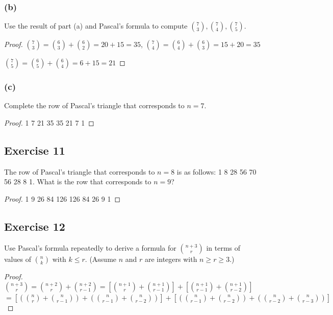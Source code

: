 \documentclass[14pt]{extarticle}
\begin{document}
\subsubsection{(b)}
Use the result of part (a) and Pascal’s formula to compute 
\(\binom{7}{3}, \binom{7}{4}, \binom{7}{5}\).

\begin{proof}
\(\binom{7}{3} = \binom{6}{3} + \binom{6}{2} = 20 + 15 = 35\),
\(\binom{7}{4} = \binom{6}{4} + \binom{6}{3} = 15 + 20 = 35\)

\(\binom{7}{5} = \binom{6}{5} + \binom{6}{4} = 6 + 15 = 21\)
\end{proof}

\subsubsection{(c)}
Complete the row of Pascal’s triangle that corresponds to \(n = 7\).

\begin{proof}
1 7 21 35 35 21 7 1
\end{proof}

\subsection{Exercise 11}
The row of Pascal’s triangle that corresponds to \(n = 8\) is as follows: 1 8 28 56 70 56 28 8 1. What is the row that 
corresponds to \(n = 9\)?

\begin{proof}
1 9 26 84 126 126 84 26 9 1
\end{proof}

\subsection{Exercise 12}
Use Pascal’s formula repeatedly to derive a formula for \(\binom{n+3}{r}\) in terms of values of \(\binom{n}{k}\) with 
\(k \leq r\). (Assume \(n\) and \(r\) are integers with \(n \geq r \geq 3\).)

\begin{proof}
\(\binom{n+3}{r} = \binom{n+2}{r} + \binom{n+2}{r-1} = \left[\binom{n+1}{r} + \binom{n+1}{r-1}\right] + 
\left[\binom{n+1}{r-1} + \binom{n+1}{r-2}\right]\)
\newpage
\(= \left[\left(\binom{n}{r} + \binom{n}{r-1}\right) + \left(\binom{n}{r-1} + \binom{n}{r-2}\right)\right] + 
\left[\left(\binom{n}{r-1} + \binom{n}{r-2}\right) + \left(\binom{n}{r-2} + \binom{n}{r-3}\right)\right]\)
\end{proof}
\end{document}
